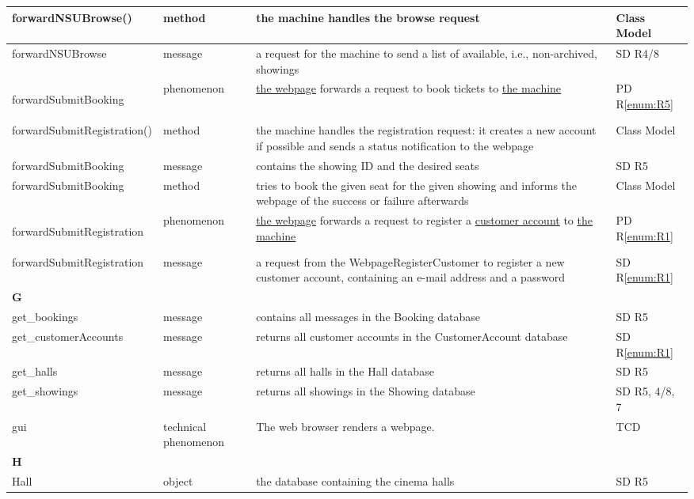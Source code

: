 \documentclass[a4paper,10pt,titlepage,bibtotoc,bibtotocnumbered]{scrreprt}
\begin{document}
\begin{longtable}{|p{4cm}|p{3cm}|p{5cm}|l|}
\hline
forwardNSUBrowse() & method & the machine handles the browse request & Class Model\\
\hline
forwardNSUBrowse & message & a request for the machine to send a list of available, i.e., non-archived, showings & SD R4/8\\
\hline
\hypertarget{glossary:forwardSubmitBooking}{forwardSubmitBooking} & phenomenon & \hyperlink{glossary:WebpageBookTickets}{the webpage} forwards a request to book tickets to \hyperlink{glossary:UDEKino}{the machine} & PD R\ref{enum:R5}\\
\hline
forwardSubmitRegistration() & method & the machine handles the registration request: it creates a new account if possible and sends a status notification to the webpage & Class Model\\
\hline
forwardSubmitBooking & message & contains the showing ID and the desired seats & SD R5\\
\hline
forwardSubmitBooking & method & tries to book the given seat for the given showing and informs the webpage of the success or failure afterwards & Class Model\\
\hline
\hypertarget{glossary:forwardSubmitRegistration}{forwardSubmitRegistration} & phenomenon & \hyperlink{glossary:WebpageRegisterCustomer}{the webpage} forwards a request to register a \hyperlink{glossary:Customer}{customer account} to \hyperlink{glossary:UDEKino}{the machine} & PD R\ref{enum:R1}\\
\hline
forwardSubmitRegistration & message & a request from the WebpageRegisterCustomer to register a new customer account, containing an e-mail address and a password & SD R\ref{enum:R1}\\
\hline
\multicolumn{4}{|l|}{\textbf{G}}\\
\hline
get\_bookings & message & contains all messages in the Booking database & SD R5\\
\hline
get\_customerAccounts & message & returns all customer accounts in the CustomerAccount database & SD R\ref{enum:R1}\\
\hline
get\_halls & message & returns all halls in the Hall database & SD R5\\
\hline
get\_showings & message & returns all showings in the Showing database & SD R5, 4/8, 7\\
\hline
gui & technical phenomenon & The web browser renders a webpage. & TCD\\
\hline
\multicolumn{4}{|l|}{\textbf{H}}\\
\hline
Hall & object & the database containing the cinema halls & SD R5\\

\end{longtable}
\end{document}
